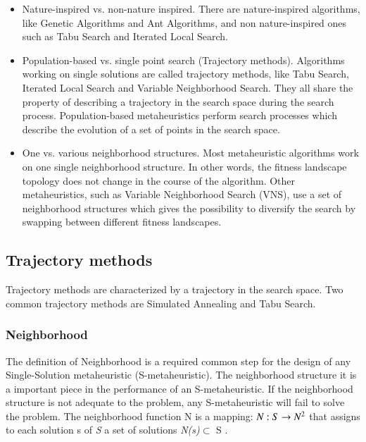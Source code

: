 \documentclass{report}
\begin{document}
\begin{itemize}
\item Nature-inspired vs. non-nature inspired. There are nature-inspired algorithms, like Genetic Algorithms and Ant Algorithms, and non nature-inspired ones such as Tabu Search and Iterated Local Search.

\item Population-based vs. single point search (Trajectory methods). Algorithms working on single solutions are called trajectory methods, like Tabu Search, Iterated Local Search and Variable Neighborhood Search. They all share the property of describing a trajectory in the search space during the search process. Population-based metaheuristics perform search processes which describe the evolution of a set of points in the search space.

\item One vs. various neighborhood structures. Most metaheuristic algorithms work on one single neighborhood structure. In other words, the fitness landscape topology does not change in the course of the algorithm. Other metaheuristics, such as Variable Neighborhood Search (VNS), use a set of neighborhood structures which gives the possibility to diversify the search by swapping between different fitness
landscapes.


\end{itemize}

\subsection{Trajectory methods}

Trajectory methods are characterized by a trajectory in the search space. Two common trajectory methods are Simulated Annealing and Tabu Search.

\subsubsection{Neighborhood}

The definition of Neighborhood is a required common step for the design of any Single-Solution metaheuristic (S-metaheuristic). The neighborhood structure it is a important piece in the performance of an S-metaheuristic. If the neighborhood structure is not adequate to the problem,
any S-metaheuristic will fail to solve the problem. The neighborhood function N is a mapping: $ N : S \rightarrow N\textsuperscript{2} $ that assigns to each solution s of \textit{S} a set of solutions \textit{N(s)}$\subset$ S \cite{Talbi2013}.
\end{document}
